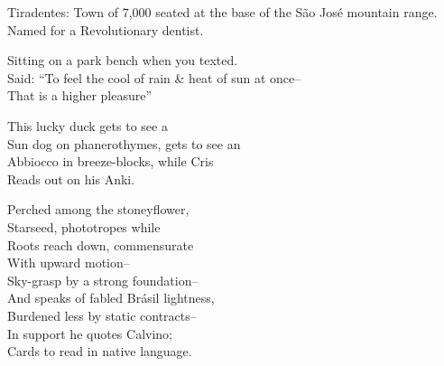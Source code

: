 Tiradentes: Town of 7,000 seated at the base of the São José mountain range. Named for a Revolutionary dentist.

Sitting on a park bench when you texted. \\
Said: ``To feel the cool of rain \& heat of sun at once-- \\
That is a higher pleasure''

This lucky duck gets to see a \\
Sun dog on phanerothymes, gets to see an \\
Abbiocco in breeze-blocks, while Cris \\
Reads out on his Anki.

Perched among the stoneyflower, \\
Starseed, phototropes while \\
Roots reach down, commensurate \\
With upward motion-- \\
Sky-grasp by a strong foundation-- \\

And speaks of fabled Brásil lightness, \\
Burdened less by static contracts-- \\
In support he quotes Calvino; \\
Cards to read in native language.